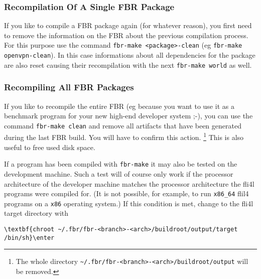 \subsubsection{Recompilation Of A Single FBR Package}

If you like to compile a FBR package again (for whatever reason),
you first need to remove the information on the FBR about the previous
compilation process. For this purpose use the command \texttt{fbr-make <package>-clean}
(eg \texttt{fbr-make openvpn-clean}). In this case informations about
all dependencies for the package are also reset causing their recompilation
with the next \texttt {fbr-make world} as well.

\subsubsection{Recompiling All FBR Packages}

If you like to recompile the entire FBR (eg because you want to use it as
a benchmark program for your new high-end developer system ;-),
you can use the command \texttt{fbr-make clean} and remove all artifacts
that have been generated during the last FBR build. You will have to
confirm this action. \footnote{The whole directory
\texttt{\~{}/.fbr/fbr-<branch>-<arch>/buildroot/output} will be removed.}
This is also useful to free used disk space.


If a program has been compiled with \texttt{fbr-make} it may also be tested
on the development machine. Such a test will of course only work if the processor
architecture of the developer machine matches the processor architecture the
fli4l programs were compiled for. (It is not possible, for example,
to run \texttt{x86\_64} flil4 programs on a \texttt{x86} operating system.)
If this condition is met, change to the fli4l target directory with

\begin{example}
\begin{Verbatim}[commandchars=\\\{\}]
\textbf{chroot ~/.fbr/fbr-<branch>-<arch>/buildroot/output/target /bin/sh}\enter
\end{Verbatim}
\end{example}

